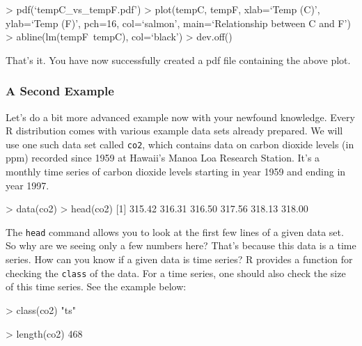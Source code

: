 \documentclass[11pt,twosided]{article}
\begin{document}
\begin{tcolorbox}[breakable,boxrule=0.5pt,enhanced]
\begin{code}
> pdf(`tempC_vs_tempF.pdf')
> plot(tempC, tempF, xlab=`Temp (C)', ylab=`Temp (F)', pch=16, col=`salmon', 
  main=`Relationship between C and F')
> abline(lm(tempF~tempC), col=`black')
> dev.off()
\end{code}
\end{tcolorbox}
\vspace{2ex}

That's it.  You have now successfully created a pdf file containing the above plot.\\


\subsubsection{A Second Example}
Let's do a bit more advanced example now with your newfound knowledge.  Every R distribution comes with various example data sets already prepared.  We will use one such data set called {\tt co2}, which contains data on carbon dioxide levels (in ppm) recorded since 1959 at Hawaii's Manoa Loa Research Station. It's a monthly time series of carbon dioxide levels starting in year 1959 and ending in year 1997. \\


\begin{tcolorbox}[breakable,boxrule=0.5pt,enhanced]
\begin{code}
> data(co2)
> head(co2)
[1] 315.42 316.31 316.50 317.56 318.13 318.00
\end{code}
\end{tcolorbox}
\vspace{2ex}

The {\tt head} command allows you to look at the first few lines of a given data set.  So why are we seeing only a few numbers here?  That's because this data is a time series.  How can you know if a given data is time series?  R provides a function for checking the {\tt class} of the data.  For a time series, one should also check the size of this time series.  See the example below:\\

\begin{tcolorbox}[breakable,boxrule=0.5pt,enhanced]
\begin{code}
> class(co2)
"ts"

> length(co2)
468
\end{code}
\end{tcolorbox}
\vspace{2ex}
\end{document}
